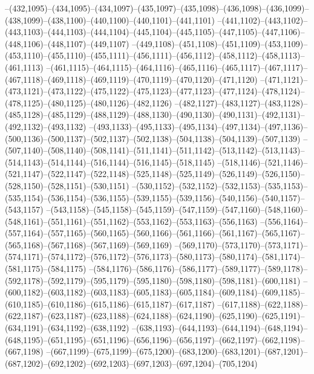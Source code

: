 --(432,1095)--(434,1095)--(434,1097)--(435,1097)--(435,1098)--(436,1098)--(436,1099)--(438,1099)--(438,1100)--(440,1100)--(440,1101)--(441,1101)
--(441,1102)--(443,1102)--(443,1103)--(444,1103)--(444,1104)--(445,1104)--(445,1105)--(447,1105)--(447,1106)--(448,1106)--(448,1107)--(449,1107)
--(449,1108)--(451,1108)--(451,1109)--(453,1109)--(453,1110)--(455,1110)--(455,1111)--(456,1111)--(456,1112)--(458,1112)--(458,1113)--(461,1113)
--(461,1115)--(464,1115)--(464,1116)--(465,1116)--(465,1117)--(467,1117)--(467,1118)--(469,1118)--(469,1119)--(470,1119)--(470,1120)--(471,1120)
--(471,1121)--(473,1121)--(473,1122)--(475,1122)--(475,1123)--(477,1123)--(477,1124)--(478,1124)--(478,1125)--(480,1125)--(480,1126)--(482,1126)
--(482,1127)--(483,1127)--(483,1128)--(485,1128)--(485,1129)--(488,1129)--(488,1130)--(490,1130)--(490,1131)--(492,1131)--(492,1132)--(493,1132)
--(493,1133)--(495,1133)--(495,1134)--(497,1134)--(497,1136)--(500,1136)--(500,1137)--(502,1137)--(502,1138)--(504,1138)--(504,1139)--(507,1139)
--(507,1140)--(508,1140)--(508,1141)--(511,1141)--(511,1142)--(513,1142)--(513,1143)--(514,1143)--(514,1144)--(516,1144)--(516,1145)--(518,1145)
--(518,1146)--(521,1146)--(521,1147)--(522,1147)--(522,1148)--(525,1148)--(525,1149)--(526,1149)--(526,1150)--(528,1150)--(528,1151)--(530,1151)
--(530,1152)--(532,1152)--(532,1153)--(535,1153)--(535,1154)--(536,1154)--(536,1155)--(539,1155)--(539,1156)--(540,1156)--(540,1157)--(543,1157)
--(543,1158)--(545,1158)--(545,1159)--(547,1159)--(547,1160)--(548,1160)--(548,1161)--(551,1161)--(551,1162)--(553,1162)--(553,1163)--(556,1163)
--(556,1164)--(557,1164)--(557,1165)--(560,1165)--(560,1166)--(561,1166)--(561,1167)--(565,1167)--(565,1168)--(567,1168)--(567,1169)--(569,1169)
--(569,1170)--(573,1170)--(573,1171)--(574,1171)--(574,1172)--(576,1172)--(576,1173)--(580,1173)--(580,1174)--(581,1174)--(581,1175)--(584,1175)
--(584,1176)--(586,1176)--(586,1177)--(589,1177)--(589,1178)--(592,1178)--(592,1179)--(595,1179)--(595,1180)--(598,1180)--(598,1181)--(600,1181)
--(600,1182)--(603,1182)--(603,1183)--(605,1183)--(605,1184)--(609,1184)--(609,1185)--(610,1185)--(610,1186)--(615,1186)--(615,1187)--(617,1187)
--(617,1188)--(622,1188)--(622,1187)--(623,1187)--(623,1188)--(624,1188)--(624,1190)--(625,1190)--(625,1191)--(634,1191)--(634,1192)--(638,1192)
--(638,1193)--(644,1193)--(644,1194)--(648,1194)--(648,1195)--(651,1195)--(651,1196)--(656,1196)--(656,1197)--(662,1197)--(662,1198)--(667,1198)
--(667,1199)--(675,1199)--(675,1200)--(683,1200)--(683,1201)--(687,1201)--(687,1202)--(692,1202)--(692,1203)--(697,1203)--(697,1204)--(705,1204)
